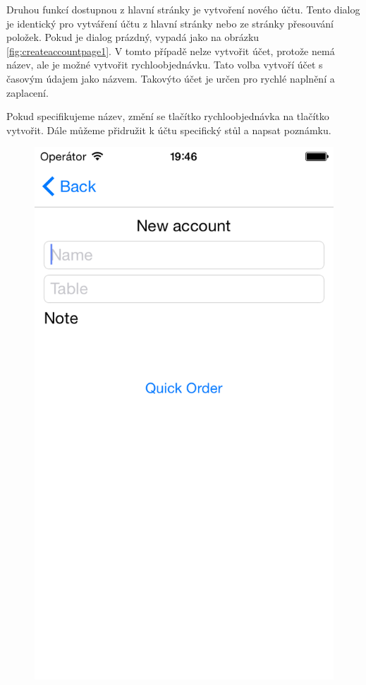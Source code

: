 Druhou funkcí dostupnou z hlavní stránky je vytvoření nového účtu.
Tento dialog je identický pro vytváření účtu z hlavní stránky nebo ze stránky přesouvání položek.
Pokud je dialog prázdný, vypadá jako na obrázku \ref{fig:createaccountpage1}.
V tomto případě nelze vytvořit účet, protože nemá název, ale je možné vytvořit rychloobjednávku.
Tato volba vytvoří účet s časovým údajem jako názvem.
Takovýto účet je určen pro rychlé naplnění a zaplacení.

Pokud specifikujeme název, změní se tlačítko rychloobjednávka na tlačítko vytvořit.
Dále můžeme přidružit k účtu specifický stůl a napsat poznámku.\\

\begin{figure}
\centering
\begin{minipage}{.5\textwidth}
  \centering
  \includegraphics[width=.95\textwidth]{quickorder.png}

\end{minipage}
\end{figure}
